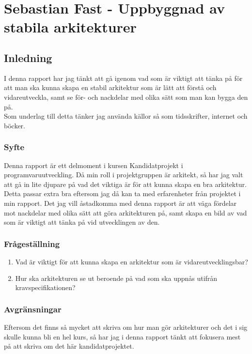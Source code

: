 \section{Sebastian Fast - Uppbyggnad av stabila arkitekturer}
\subsection{Inledning}
I denna rapport har jag tänkt att gå igenom vad som är viktigt att tänka på för att man ska kunna skapa en stabil arkitektur som är lätt att förstå och vidareutveckla, samt se för- och nackdelar med olika sätt som man kan bygga den på.
\\
Som underlag till detta tänker jag använda källor så som tidsskrifter, internet och böcker.   
\subsubsection{Syfte}
Denna rapport är ett delmoment i kursen Kandidatprojekt i programvaruutveckling. Då min roll i projektgruppen är arkitekt, så har jag valt att gå in lite djupare på vad det viktiga är för att kunna skapa en bra arkitektur. Detta passar extra bra eftersom jag då kan ta med erfarenheter från projektet i min rapport.
Det jag vill åstadkomma med denna rapport är att väga fördelar mot nackdelar med olika sätt att göra arkitekturen på, samt skapa en bild av vad som är viktigt att tänka på vid utvecklingen av den.
\subsubsection{Frågeställning}
\begin{enumerate}
	\item Vad är viktigt för att kunna skapa en arkitektur som är vidareutvecklingsbar?
	\item Hur ska arkitekturen se ut beroende på vad som ska uppnås utifrån kravspecifikationen?
\end{enumerate}
\subsubsection{Avgränsningar}
Eftersom det finns så mycket att skriva om hur man gör arkitekturer och det i sig skulle kunna bli en hel kurs, så har jag i denna rapport tänkt att fokusera mest på att skriva om det här kandidatprojektet. 
